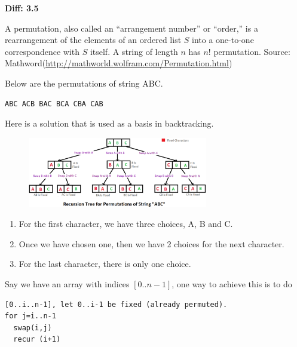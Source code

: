 
\noindent{}\textbf{Diff: 3.5}

A permutation, also called an ``arrangement number'' or ``order,'' is a 
rearrangement of the elements of an ordered list $S$ into a one-to-one 
correspondence with $S$ itself. A string of length $n$ has $n!$ permutation.
Source: Mathword(\url{http://mathworld.wolfram.com/Permutation.html})

Below are the permutations of string ABC.
\begin{lstlisting}[style=raygeneric]
ABC ACB BAC BCA CBA CAB
\end{lstlisting}

\textbf{}

Here is a solution that is used as a basis in backtracking.

\begin{figure}
\centering
\includegraphics[width=0.7\textwidth]{Images/figGFGNewPermutation}
\label{figGFGNewPermutation}
\end{figure}

\qasepline{}

\begin{enumerate}[label=\textbf{\arabic*.},noitemsep,topsep=0pt]
\item For the first character, we have three choices, A, B and C.
\item Once we have chosen one, then we have 2 choices for the next
  character.
\item For the last character, there is only one choice.
\end{enumerate}

Say we have an array with indices $[0..n-1]$, one way to achieve this is to
do
\begin{lstlisting}[style=pseudostyle,numbers=none]
[0..i..n-1], let 0..i-1 be fixed (already permuted).
for j=i..n-1
  swap(i,j)
  recur (i+1)
\end{lstlisting}

